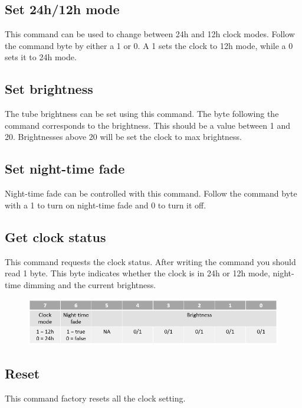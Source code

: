 \documentclass[12pt]{article}
\begin{document}
\subsection{Set 24h/12h mode}
This command can be used to change between 24h and 12h clock modes. Follow the command byte by either a 1 or 0. A 1 sets the clock to 12h mode, while a 0 sets it to 24h mode. 

\subsection{Set brightness}
The tube brightness can be set using this command. The byte following the command corresponds to the brightness. This should be a value between 1 and 20. Brightnesses above 20 will be set the clock to max brightness. 

\subsection{Set night-time fade}
Night-time fade can be controlled with this command. Follow the command byte with a 1 to turn on night-time fade and 0 to turn it off.

\subsection{Get clock status}
This command requests the clock status. After writing the command you should read 1 byte. This byte indicates whether the clock is in 24h or 12h mode, night-time dimming and the current brightness.

\begin{figure}[!h]
\includegraphics[scale=0.5]{status}
\centering
\caption*{}
\label{fig:status}
\end{figure}


\subsection{Reset}
This command factory resets all the clock setting.
\end{document}
